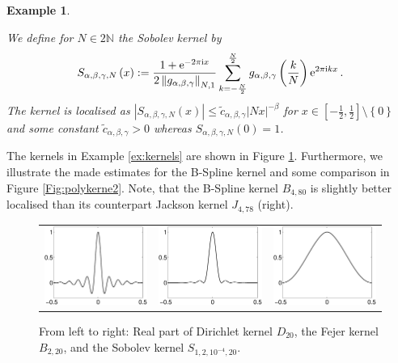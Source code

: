 \documentclass[11pt,a4paper,bibtotoc]{scrartcl}
\def\N{\mathbb{N}}
\def\ti{\mbox{\scriptsize{\rm i}}}
\newcommand{\eip}[1]{{\rm e}^{ 2\pi{\ti} #1}}
\newcommand{\eim}[1]{{\rm e}^{-2\pi{\ti} #1}}
\newtheorem{example}[theorem]{Example}
\newenvironment{Example}{\goodbreak \begin{example}\rm}{\end{example}}
\numberwithin{equation}{section}
\numberwithin{table}{section}
\numberwithin{figure}{section}
\begin{document}
\begin{Example}
\begin{enumerate}
  We define for $N\in2\N$ the Sobolev kernel by
  \begin{equation*}
    S_{\alpha,\beta,\gamma,N}\left(x\right)
    :=\frac{1+\eim{x}}{2\left\|g_{\alpha,\beta,\gamma}\right\|_{N,1}}
    \sum_{k=-\frac{N}{2}}^{\frac{N}{2}}
    g_{\alpha,\beta,\gamma}\left(\frac{k}{N}\right)
   \eip{kx}\,.
  \end{equation*}
  The kernel is localised as $|S_{\alpha,\beta,\gamma,N}(x)| \le \tilde
  c_{\alpha,\beta,\gamma} |Nx|^{-\beta}$ for
  $x\in\left[-\frac{1}{2},\frac{1}{2}\right] \setminus\left\{0\right\}$
  and some constant $\tilde c_{\alpha,\beta,\gamma}>0$ whereas
  $S_{\alpha,\beta,\gamma,N}\left(0\right)=1$.
\end{enumerate}
\end{Example}

The kernels in Example \ref{ex:kernels} are shown in Figure
\ref{Fig:polykerne}.
Furthermore, we illustrate the made estimates for the B-Spline kernel and some
comparison in Figure \ref{Fig:polykerne2}.
Note, that the B-Spline kernel $B_{4,80}$ is slightly better localised than
its counterpart Jackson kernel $J_{4,78}$ (right).
\begin{figure}[ht]
  \begin{center}
    \begin{tabular}{ccc}
      \includegraphics[width=4cm]{images/polynomial_kernels1.eps} &
      \includegraphics[width=4cm]{images/polynomial_kernels2.eps} &
      \includegraphics[width=4cm]{images/polynomial_kernels4.eps}
    \end{tabular}
  \end{center}
  \caption{From left to right: Real part of Dirichlet kernel $D_{20}$, the
    Fejer kernel $B_{2,20}$, and the Sobolev kernel
    $S_{1,2,10^{-4},20}$. \label{Fig:polykerne}}
\end{figure}
\end{document}
